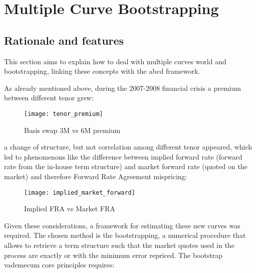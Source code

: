 \chapter{Multiple Curve Bootstrapping}
\label{chap:bootstrapping}

\section{Rationale and features}

This section aims to explain how to deal with multiple curves world and bootstrapping, linking these concepts with the abcd framework.

As already mentioned above, during the 2007-2008 financial crisis a premium between different tenor grew:

\begin{figure}[H]
\centering
\texttt{[image: tenor\_premium]}
\caption{Basis swap 3M vs 6M premium}
\label{fig:tenor_premium}
\end{figure}

a change of structure, but not correlation among different tenor appeared, which led to phenomenons like the difference between implied forward rate (forward rate from the in-house term structure) and market forward rate (quoted on the market) and therefore Forward Rate Agreement mispricing:

\begin{figure}[H]
\centering
\texttt{[image: implied\_market\_forward]}
\caption{Implied FRA vs Market FRA}
\label{fig:implied_market_forward}
\end{figure}

Given these considerations, a framework for estimating these new curves was required. The chosen method is the bootstrapping, a numerical procedure that allows to retrieve a term structure such that the market quotes used in the process are exactly or with the minimum error repriced.
The bootstrap vademecum core principles requires:

